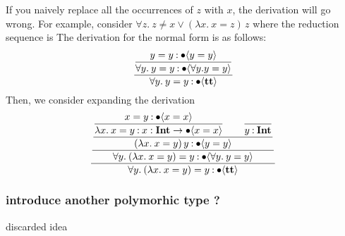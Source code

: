 \documentclass{article}
\begin{document}
If you naively replace all the occurrences of \( z \) with \( x \), the derivation will go wrong. For example, consider \( \forall z.\: z \neq x \lor (\lambda x.\: x = z)\, z\) where the reduction sequence is 
The derivation for the normal form is as follows:
\begin{align*}
    \dfrac{
        \dfrac{
            y = y \mathbin{:} \bullet \langle y = y \rangle
        }{
            \forall y.\: y = y \mathbin{:} \bullet \langle \forall y. y = y \rangle
        }
    }{
        \forall y.\: y = y \mathbin{:} \bullet \langle \textbf{tt} \rangle
    }
\end{align*}
Then, we consider expanding the derivation
\begin{align*}
    \dfrac{
        \dfrac{
            \dfrac{
                \dfrac{
                    x = y \mathbin{:} \bullet \langle x = x \rangle
                }{
                    \lambda x.\: x = y \mathbin{:} {x} : \textbf{Int} \to \bullet \langle x = x \rangle
                }
                \qquad
                \dfrac{}{
                    y \mathbin{:} \textbf{Int}
                }
            }{
                (\lambda x.\: x = y)\, y \mathbin{:} \bullet \langle y = y \rangle
            }
        }{
            \forall y.\: (\lambda x.\: x = y) = y \mathbin{:} \bullet \langle \forall y.\: y = y \rangle
        }
    }{
        \forall y.\: (\lambda x.\: x = y) = y \mathbin{:} \bullet \langle \textbf{tt} \rangle
    }
\end{align*}



\subsubsection{introduce another polymorhic type ?}

discarded idea
\end{document}
